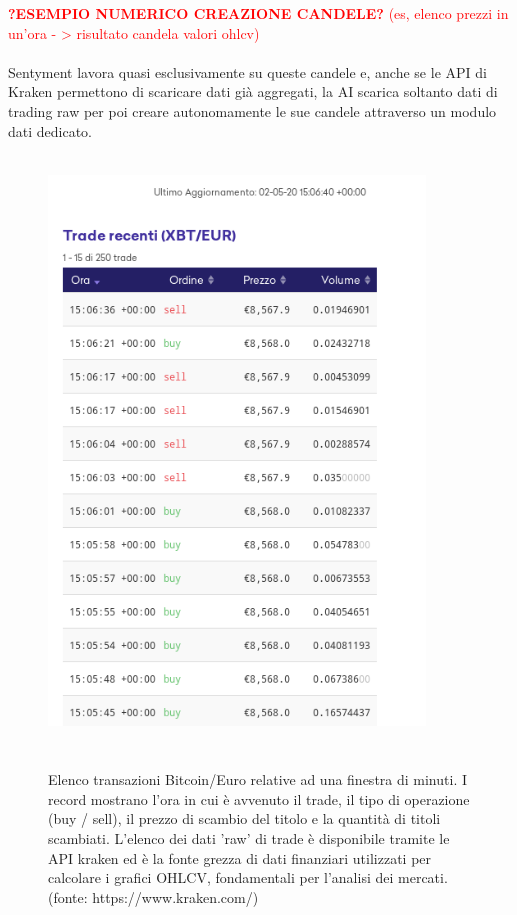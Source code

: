 \documentclass{article}
\numberwithin{equation}{section}
\begin{document}
		
		\textcolor{red}{\textbf{?ESEMPIO NUMERICO CREAZIONE CANDELE?}
			(es, elenco prezzi in un'ora - > risultato candela valori ohlcv)}
		\\~\\
		
		Sentyment lavora quasi esclusivamente su queste candele e, anche se le API di Kraken permettono di scaricare dati già aggregati, la AI scarica soltanto dati di trading raw per poi creare autonomamente le sue candele attraverso un modulo dati dedicato.
		\\~\\
		

		\begin{figure}
		\begin{center}
		\includegraphics[width=10cm]{kraken_raw}
		\caption{\\~\\Elenco transazioni Bitcoin/Euro relative ad una finestra di minuti. I record mostrano l'ora in cui è avvenuto il trade, il tipo di operazione (buy / sell), il prezzo di scambio del titolo e la quantità di titoli scambiati. L'elenco dei dati 'raw' di trade è disponibile tramite le API kraken ed è la fonte grezza di dati finanziari utilizzati per calcolare i grafici OHLCV, fondamentali per l'analisi dei mercati. (fonte: https://www.kraken.com/)}
		\end{center}
		\end{figure}
\end{document}
